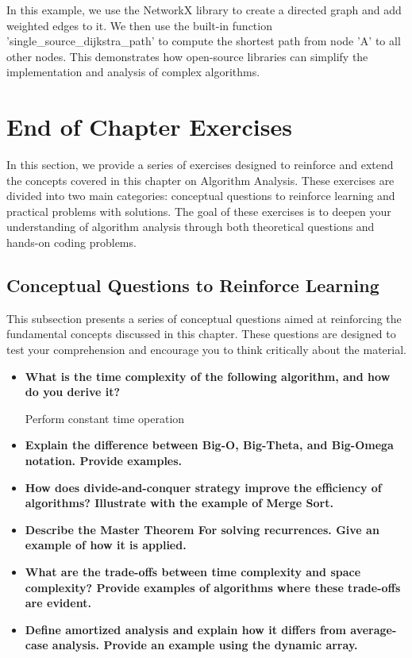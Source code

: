 \documentclass[12pt]{book} %
\begin{document}
In this example, we use the NetworkX library to create a directed graph and add weighted edges to it. We then use the built-in function 'single\_source\_dijkstra\_path' to compute the shortest path from node 'A' to all other nodes. This demonstrates how open-source libraries can simplify the implementation and analysis of complex algorithms.

\section{End of Chapter Exercises}
In this section, we provide a series of exercises designed to reinforce and extend the concepts covered in this chapter on Algorithm Analysis. These exercises are divided into two main categories: conceptual questions to reinforce learning and practical problems with solutions. The goal of these exercises is to deepen your understanding of algorithm analysis through both theoretical questions and hands-on coding problems.

\subsection{Conceptual Questions to Reinforce Learning}
This subsection presents a series of conceptual questions aimed at reinforcing the fundamental concepts discussed in this chapter. These questions are designed to test your comprehension and encourage you to think critically about the material.

\begin{itemize}
    \item \textbf{What is the time complexity of the following algorithm, and how do you derive it?} 
    \begin{algorithm}
    \caption{Sample Algorithm}
    \begin{algorithmic}
                \State Perform constant time operation
            \EndFor
        \EndFor
    \end{algorithmic}
    \end{algorithm}
    \item \textbf{Explain the difference between Big-O, Big-Theta, and Big-Omega notation. Provide examples.}
    \item \textbf{How does divide-and-conquer strategy improve the efficiency of algorithms? Illustrate with the example of Merge Sort.}
    \item \textbf{Describe the Master Theorem For solving recurrences. Give an example of how it is applied.}
    \item \textbf{What are the trade-offs between time complexity and space complexity? Provide examples of algorithms where these trade-offs are evident.}
    \item \textbf{Define amortized analysis and explain how it differs from average-case analysis. Provide an example using the dynamic array.}
\end{itemize}
\end{document}
